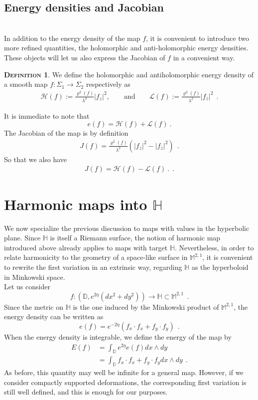 \documentclass[a4paper,11pt,openright,twoside]{book}
\renewcommand{\rho}{\varrho}
\newcommand{\M}{\mathbb{M}^{2,1}}
\newcommand{\1}{\mathds{1}}
\theoremstyle{plain}
\theoremstyle{definition}
\newtheorem{defn}[thm]{\textsc{Definition}}
\theoremstyle{remark}
\begin{document}
\subsection{Energy densities and Jacobian}\mbox{}\\
In addition to the energy density of the map $f$, it is convenient to introduce two more refined quantities, the holomorphic and anti-holomorphic energy densities. These objects will let us also express the Jacobian of $f$ in a convenient way.
\begin{defn}
	We define the holomorphic and antiholomorphic energy density of a smooth map $f:\Sigma_1\to \Sigma_2$ respectively as	
\begin{align*}
	\mathcal H(f):=\frac{\rho^2(f)}{\lambda^2}|f_z|^2,
	\qquad\text{and}\qquad
	\mathcal L(f):=\frac{\rho^2(f)}{\lambda^2}|f_{\bar z}|^2
\ \ .
\end{align*}
\end{defn}
It is immediate to note that 
\[e(f) = \mathcal H(f)+\mathcal L(f)\ .\] 
The Jacobian of the map is by definition
\begin{align*}
	J(f) =  \frac{\rho^2(f)}{\lambda^2}(|f_z|^2-|f_{\overline{z}}|^2)
\ \ . 
\end{align*}
So that we also have 
\begin{align}\label{eq:defjacob}
	J(f) = \mathcal H(f) - \mathcal L(f)\ .
\ \ . 
\end{align}
\section{Harmonic maps into $\mathbb{H}$}
We now specialize the previous discussion to maps with values in the hyperbolic plane. Since $\mathbb{H}$ is itself a Riemann surface, the notion of harmonic map introduced above already applies to maps with target $\mathbb{H}$. Nevertheless, in order to relate harmonicity to the geometry of a space-like surface in $\M$, it is convenient to rewrite the first variation in an extrinsic way, regarding $\mathbb{H}$ as the hyperboloid in Minkowski space.\\

Let us consider
\[
f:(\mathbb{D},e^{2\eta}(dx^2+dy^2))\to \mathbb{H}\subset \M
\ \ .
\]
Since the metric on $\mathbb{H}$ is the one induced by the Minkowski product of $\M$, the energy density can be written as
\[
e(f) = e^{-2\eta}(f_x\cdot f_x+f_y\cdot f_y)
\ \ .
\]
When the energy density is integrable, we define the energy of the map by
\begin{align*}
	E(f)
	&=
	\int_{\mathbb{D}} e^{2\eta} e(f) dx \wedge dy\\
	&=
	\int_{\mathbb{D}} f_x\cdot f_x +f_y\cdot f_y dx  \wedge dy
	\ \ .
\end{align*}
As before, this quantity may well be infinite for a general map. However, if we consider compactly supported deformations, the corresponding first variation is still well defined, and this is enough for our purposes.\\
\end{document}
